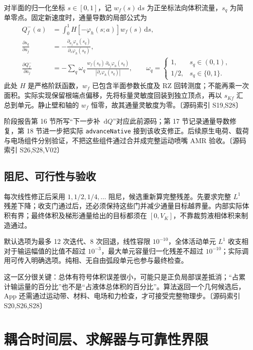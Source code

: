 \documentclass[UTF8,a4paper,11pt,fontset=fandol]{ctexart}
\newcommand{\code}[1]{\nolinkurl{#1}}
\newcommand{\src}[1]{\textcolor{ink}{\small〔源码索引 #1〕}}
\newcommand{\dd}{\,\mathrm{d}}
\begin{document}
对半面的归一化坐标 $s\in[0,1]$，记 $w_f(s)\dd s$ 为正坐标法向体积流量，$s_q$ 为简单零点。固定新速度时，通量导数的局部公式为
\begin{align}
 Q_f^-(a)&=\int_0^1 H[-\varphi_h(s;a)]w_f(s)\dd s,\\
 \frac{\partial s_q}{\partial a_j}&=-\frac{\partial_{a_j}\varphi_h(s_q)}{\partial_s\varphi_h(s_q)},\\
 \frac{\partial Q_f^-}{\partial a_j}
 &=-\sum_q\omega_q\,\frac{w_f(s_q)\,\partial_{a_j}\varphi_h(s_q)}{|\partial_s\varphi_h(s_q)|},
 \qquad\omega_q=\begin{cases}1,&s_q\in(0,1),\\1/2,&s_q\in\{0,1\}.\end{cases}
\end{align}
此处 $H$ 是严格阶跃函数，$w_f$ 已包含半面参数长度及 RZ 回转测度；不能再乘一次面积。实际实现保留根端点偏移，先将标量灵敏度回装到独立顶点，再以 $s_{Kf}$ 汇总到单元。静止壁和轴的 $w_f$ 恒零，故其通量灵敏度为零。\src{S19,S28}

阶段报告第 16 节所写“下一步补 $\dd Q$”对应此前源码；第 17 节记录通量导数修复，第 18 节进一步把实际 \code{advanceNative} 接到该收支修正。后续原生电荷、载荷与电场组件分别验证，不把这些组件通过合并成完整运动喷嘴 AMR 验收。\src{S26,S28,V02}

\subsection{阻尼、可行性与验收}
每次线性修正后采用 $1,1/2,1/4,\ldots$ 阻尼，候选重新算完整残差。先要求完整 $L^1$ 残差下降；收支门通过后，还必须保持这些门并减少通量目标越界量。内部实际体积有界；最终体积及梯形通量给出的目标都须在 $[0,V_K]$，不靠裁剪液相体积来制造通过。

默认选项为最多 12 次迭代、8 次回退，线性容限 $10^{-10}$，全体活动单元 $L^1$ 收支相对于输运幅值的比值不超过 $10^{-3}$，最大单元容量归一化残差不超过 $10^{-10}$；实际调用可传入明确选项。纯相、无自由弧段单元也参与最终检查。

这一区分很关键：总体有符号体积误差很小，可能只是正负局部误差抵消；“占累计输运量的百分比”也不是“占液体总体积的百分比”。算法返回一个几何候选后，App 还需通过运动带、材料、电场和力检查，才可接受完整物理步。\src{S20,S26,S28}

\section{耦合时间层、求解器与可靠性界限}
\end{document}
